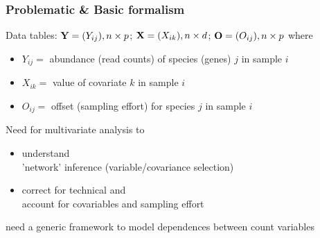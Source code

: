 \documentclass[10pt, c, xcolor=x11names]{beamer}\usepackage[]{graphicx}\usepackage[]{color}
\begin{document}
\begin{frame}[fragile]
\end{frame}

\begin{frame}
  \frametitle{Problematic \& Basic formalism}
  
  \begin{block}{Data tables: $\mathbf{Y} = (Y_{ij}), n \times p$;  $\mathbf{X} = (X_{ik}), n \times d$; $\mathbf{O} = (O_{ij}), n \times p$ where}
    \vspace{-.25cm}
    \begin{itemize}
    \item $Y_{ij} = $ abundance (read counts) of species (genes) $j$ in sample $i$
    \item $X_{ik} = $ value of covariate $k$ in sample $i$
    \item $O_{ij} = $ offset (sampling effort) for species $j$ in sample $i$
    \end{itemize}
  \end{block}

  \vfill

  \begin{block}{Need for multivariate analysis to}
    \vspace{-.25cm}
    \begin{itemize}
    \item understand  \\
      \rsa 'network' inference (variable/covariance selection)
    \item correct for technical and  \\
      \rsa account for covariables and sampling effort
    \end{itemize}
  \end{block}

  \rsa need a generic framework to \alert{model dependences between count variables}

\end{frame}

\end{document}
